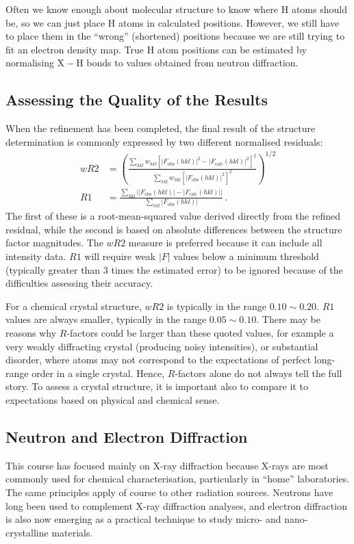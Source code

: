 \documentclass{article}
\theoremstyle{plain}\theoremheaderfont{\normalfont\itshape}\theorembodyfont{\rmfamily}\theoremseparator{.}\newtheorem*{rem}{Remark}\newtheorem*{ex}{Example}\newtheorem*{proof}{Proof}\newtheorem*{altp}{Alternative proof}
\theoremstyle{plain}\theoremheaderfont{\normalfont\bfseries}\theorembodyfont{\rmfamily}\theoremseparator{.}\newtheorem{thm}{Theorem}[section]\newtheorem{lem}[thm]{Lemma}\newtheorem{prop}[thm]{Proposition}\newtheorem*{cor}{Corollary}\newtheorem{defn}[thm]{Definition}\newtheorem{clm}[thm]{Claim}\newtheorem{clminproof}{Claim}\newtheorem*{law}{Law}\newtheorem{pos}[thm]{Postulate}
\theoremstyle{break}\theoremheaderfont{\normalfont\itshape}\theorembodyfont{\rmfamily}\theoremseparator{.\medskip}\newtheorem*{proofskip}{Proof}\newtheorem*{exs}{Examples}\newtheorem*{rems}{Remarks}
\theoremstyle{break}\theoremheaderfont{\normalfont\bfseries}\theorembodyfont{\rmfamily}\theoremseparator{.\medskip}\newtheorem{lemskip}[thm]{Lemma}\newtheorem{defnskip}[thm]{Definition}\newtheorem{propskip}[thm]{Proposition}\newtheorem{thmskip}[thm]{Theorem}
\numberwithin{equation}{section}
\newcommand{\abs}[1]{\left| #1 \right|}
\begin{document}
    Often we know enough about molecular structure to know where H atoms should be, so we can just place H atoms in calculated positions. However, we still have to place them in the ``wrong'' (shortened) positions because we are still trying to fit an electron density map. True H atom positions can be estimated by normalising \(\mathrm{X-H}\) bonds to values obtained from neutron diffraction.

    \subsection{Assessing the Quality of the Results}
    When the refinement has been completed, the final result of the structure determination is commonly expressed by two different normalised residuals:
    \begin{align}
        wR2&=\left(\frac{\sum_{hkl}w_{hkl}\left[\abs{F_{\text{obs}}(hkl)}^2-\abs{F_{\text{calc}}(hkl)}^2\right]^2}{\sum_{hkl}w_{hkl}\left[\abs{F_{\text{obs}}(hkl)}^2\right]^2}\right)^{1/2}\\
        R1&=\frac{\sum_{hkl}\abs{\abs{F_{\text{obs}}(hkl)}-\abs{F_{\text{calc}}(hkl)}}}{\sum_{hkl}\abs{F_{\text{obs}}(hkl)}}\,.
    \end{align}
    The first of these is a root-mean-squared value derived directly from the refined residual, while the second is based on absolute differences between the structure factor magnitudes. The \(wR2\) measure is preferred because it can include all intensity data. \(R1\) will require weak \(\abs{F}\) values below a minimum threshold (typically greater than 3 times the estimated error) to be ignored because of the difficulties assessing their accuracy.

    For a chemical crystal structure, \(wR2\) is typically in the range \(0.10\sim 0.20\). \(R1\) values are always smaller, typically in the range \(0.05\sim 0.10\). There may be reasons why \(R\)-factors could be larger than these quoted values, for example a very weakly diffracting crystal (producing noisy intensities), or substantial disorder, where atoms may not correspond to the expectations of perfect long-range order in a single crystal. Hence, \(R\)-factors alone do not always tell the full story. To assess a crystal structure, it is important also to compare it to expectations based on physical and chemical sense.

    \subsection{Neutron and Electron Diffraction}
    This course has focused mainly on X-ray diffraction because X-rays are most commonly used for chemical characterisation, particularly in ``home'' laboratories. The same principles apply of course to other radiation sources. Neutrons have long been used to complement X-ray diffraction analyses, and electron diffraction is also now emerging as a practical technique to study micro- and nano-crystalline materials. 
\end{document}
